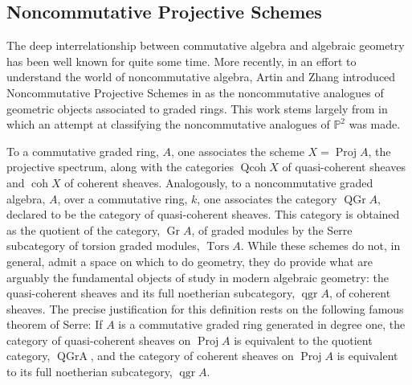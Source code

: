 \documentclass[11pt]{article}
\begin{document}
\subsection{Noncommutative Projective Schemes}
The deep interrelationship between commutative algebra and algebraic geometry has been well known for quite some time.
More recently, in an effort to understand the world of noncommutative algebra, Artin and Zhang introduced Noncommutative Projective Schemes in \cite{AZ94} as the noncommutative analogues of geometric objects associated to graded rings.
This work stems largely from \cite{AS87} in which an attempt at classifying the noncommutative analogues of $\mathbb{P}^2$ was made.

To a commutative graded ring, $A$, one associates the scheme $X = \operatorname{Proj} A$, the projective spectrum, along with the categories $\operatorname{Qcoh} X$ of quasi-coherent sheaves and $\operatorname{coh} X$ of coherent sheaves.  Analogously, to a noncommutative graded algebra, $A$, over a commutative ring, $k$, one associates the category $\operatorname{QGr} A$, declared to be the category of quasi-coherent sheaves.
This category is obtained as the quotient of the category, $\operatorname{Gr} A$, of graded modules by the Serre subcategory of torsion graded modules, $\operatorname{Tors} A$.
While these schemes do not, in general, admit a space on which to do geometry, they do provide what are arguably the fundamental objects of study in modern algebraic geometry: the quasi-coherent sheaves and its full noetherian subcategory, $\operatorname{qgr} A$, of coherent sheaves.
The  precise justification for this definition rests on the following famous theorem of Serre: If $A$ is a commutative graded ring generated in degree one, the category of quasi-coherent sheaves on $\operatorname{Proj} A$ is equivalent to the quotient category, $\operatorname{QGr A}$, and the category of coherent sheaves on $\operatorname{Proj} A$ is equivalent to its full noetherian subcategory, $\operatorname{qgr} A$.
\end{document}
